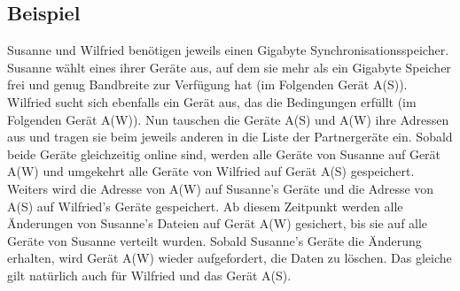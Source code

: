 \subsection{Beispiel}
Susanne und Wilfried benötigen jeweils einen Gigabyte Synchronisationsspeicher. Susanne wählt eines ihrer Geräte aus, auf dem sie mehr als ein Gigabyte Speicher frei und genug Bandbreite zur Verfügung hat (im Folgenden Gerät A(S)). Wilfried sucht sich ebenfalls ein Gerät aus, das die Bedingungen erfüllt (im Folgenden Gerät A(W)). Nun tauschen die Geräte A(S) und A(W) ihre Adressen aus und tragen sie beim jeweils anderen in die Liste der Partnergeräte ein. Sobald beide Geräte gleichzeitig online sind, werden alle Geräte von Susanne auf Gerät A(W) und umgekehrt alle Geräte von Wilfried auf Gerät A(S) gespeichert. Weiters wird die Adresse von A(W) auf Susanne's Geräte und die Adresse von A(S) auf Wilfried's Geräte gespeichert. Ab diesem Zeitpunkt werden alle Änderungen von Susanne's Dateien auf Gerät A(W) gesichert, bis sie auf alle Geräte von Susanne verteilt wurden. Sobald Susanne's Geräte die Änderung erhalten, wird Gerät A(W) wieder aufgefordert, die Daten zu löschen. Das gleiche gilt natürlich auch für Wilfried und das Gerät A(S). 